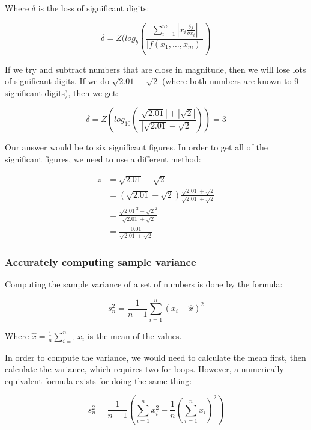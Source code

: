 Where $\delta$ is the loss of significant digits:

\[
  \delta = Z(log_b(
    \frac{
      \sum^m_{i=1}|x_i\frac{\delta f}{\delta x_i}|
    }{
      |f(x_1, \dots, x_m)|
    }
  )
\]

If we try and subtract numbers that are close in magnitude, then we will lose
lots of significant digits. If we do $\sqrt{2.01} - \sqrt{2}$ (where both
numbers are known to 9 significant digits), then we get:

\[
  \delta = Z(log_10(
    \frac{
      |\sqrt{2.01}| + |\sqrt{2}|
    }{
      |\sqrt{2.01} - \sqrt{2}|
    })) = 3
\]

Our answer would be to six significant figures. In order to get all of the
significant figures, we need to use a different method:

\[
  \begin{split}
    z &= \sqrt{2.01} - \sqrt{2}\\
      &= (\sqrt{2.01} - \sqrt{2})\frac{\sqrt{2.01}
         + \sqrt{2}}{\sqrt{2.01} + \sqrt{2}}\\
      &= \frac{\sqrt{2.01}^2 - \sqrt{2}^2}{\sqrt{2.01} + \sqrt{2}}\\
      &= \frac{0.01}{\sqrt{2.01} + \sqrt{2}}
  \end{split}
\]


\subsubsection{Accurately computing sample variance}

Computing the sample variance of a set of numbers is done by the formula:

\[
  s^2_n = \frac{1}{n - 1}\sum^n_{i=1}(x_i - \hat{x})^2
\]

Where $\hat{x} = \frac{1}{n}\sum^n_{i=1}x_i$ is the mean of the values.

In order to compute the variance, we would need to calculate the mean first,
then calculate the variance, which requires two for loops. However, a
numerically equivalent formula exists for doing the same thing:

\[
  s^2_n = \frac{1}{n-1}(\sum^n_{i=1}x_i^2 - \frac{1}{n}(\sum^n_{i=1}x_i)^2)
\]

